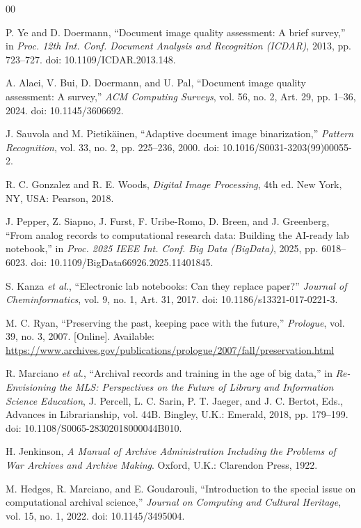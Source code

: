 \documentclass[conference]{IEEEtran}
\begin{document}
\begin{thebibliography}{00}

P. Ye and D. Doermann, ``Document image quality assessment: A brief survey,'' in \emph{Proc. 12th Int. Conf. Document Analysis and Recognition (ICDAR)}, 2013, pp. 723--727. doi: 10.1109/ICDAR.2013.148.

A. Alaei, V. Bui, D. Doermann, and U. Pal, ``Document image quality assessment: A survey,'' \emph{ACM Computing Surveys}, vol. 56, no. 2, Art. 29, pp. 1--36, 2024. doi: 10.1145/3606692.

J. Sauvola and M. Pietik{\"a}inen, ``Adaptive document image binarization,'' \emph{Pattern Recognition}, vol. 33, no. 2, pp. 225--236, 2000. doi: 10.1016/S0031-3203(99)00055-2.

R. C. Gonzalez and R. E. Woods, \emph{Digital Image Processing}, 4th ed. New York, NY, USA: Pearson, 2018.

J. Pepper, Z. Siapno, J. Furst, F. Uribe-Romo, D. Breen, and J. Greenberg, ``From analog records to computational research data: Building the AI-ready lab notebook,'' in \emph{Proc. 2025 IEEE Int. Conf. Big Data (BigData)}, 2025, pp. 6018--6023. doi: 10.1109/BigData66926.2025.11401845.

S. Kanza \emph{et al.}, ``Electronic lab notebooks: Can they replace paper?'' \emph{Journal of Cheminformatics}, vol. 9, no. 1, Art. 31, 2017. doi: 10.1186/s13321-017-0221-3.

M. C. Ryan, ``Preserving the past, keeping pace with the future,'' \emph{Prologue}, vol. 39, no. 3, 2007. [Online]. Available: \url{https://www.archives.gov/publications/prologue/2007/fall/preservation.html}

R. Marciano \emph{et al.}, ``Archival records and training in the age of big data,'' in \emph{Re-Envisioning the MLS: Perspectives on the Future of Library and Information Science Education}, J. Percell, L. C. Sarin, P. T. Jaeger, and J. C. Bertot, Eds., Advances in Librarianship, vol. 44B. Bingley, U.K.: Emerald, 2018, pp. 179--199. doi: 10.1108/S0065-28302018000044B010.

H. Jenkinson, \emph{A Manual of Archive Administration Including the Problems of War Archives and Archive Making}. Oxford, U.K.: Clarendon Press, 1922.

M. Hedges, R. Marciano, and E. Goudarouli, ``Introduction to the special issue on computational archival science,'' \emph{Journal on Computing and Cultural Heritage}, vol. 15, no. 1, 2022. doi: 10.1145/3495004.


\end{thebibliography}
\end{document}
